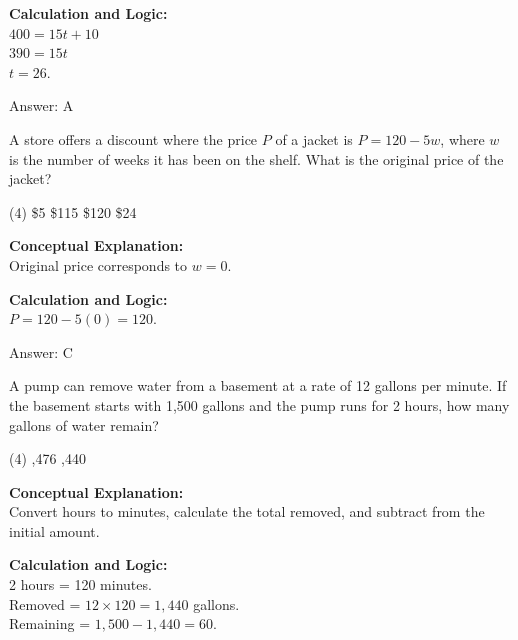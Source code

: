 \documentclass[11pt,paper=a4,answers]{exam}
\begin{document}
\begin{questions}
\begin{solution}
\vspace{10pt}
\textbf{Calculation and Logic:} \\
$400 = 15t + 10$ \\
$390 = 15t$ \\
$t = 26$.

\vspace{15pt}
Answer: \colorbox{yellow!100}{A}
\end{solution}

\vspace{20pt}

\question
A store offers a discount where the price $P$ of a jacket is $P = 120 - 5w$, where $w$ is the number of weeks it has been on the shelf. What is the original price of the jacket?
\begin{tasks}(4)
    \task \$5
    \task \$115
    \task \$120
    \task \$24
\end{tasks}

\begin{solution}
\textbf{Conceptual Explanation:} \\
Original price corresponds to $w=0$.

\vspace{10pt}
\textbf{Calculation and Logic:} \\
$P = 120 - 5(0) = 120$.

\vspace{15pt}
Answer: \colorbox{yellow!100}{C}
\end{solution}

\vspace{20pt}

\question
A pump can remove water from a basement at a rate of 12 gallons per minute. If the basement starts with 1,500 gallons and the pump runs for 2 hours, how many gallons of water remain?
\begin{tasks}(4)
    ,476
    ,440
\end{tasks}

\begin{solution}
\textbf{Conceptual Explanation:} \\
Convert hours to minutes, calculate the total removed, and subtract from the initial amount.

\vspace{10pt}
\textbf{Calculation and Logic:} \\
2 hours = 120 minutes. \\
Removed = $12 \times 120 = 1,440$ gallons. \\
Remaining = $1,500 - 1,440 = 60$.


\end{solution}
\end{questions}
\end{document}
